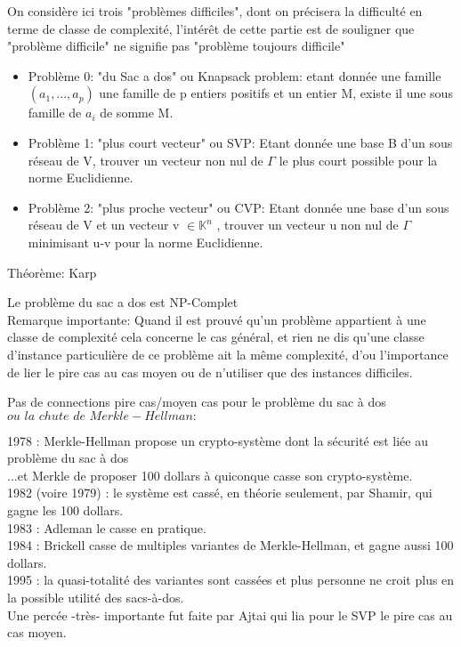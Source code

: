 On considère ici trois "problèmes difficiles", dont on précisera la difficulté en terme de classe de complexité, l'intérêt de cette partie est de souligner que "problème difficile" ne signifie pas "problème toujours difficile"
\begin{itemize}
	\item[] Problème 0: "du Sac a dos" ou Knapsack problem:
	 etant donnée une famille $(a_1, ..., a_p)$ une famille de p entiers positifs et un entier M, 
	 existe il une sous famille de $a_i$ de somme M.\\
	
	\item[] Problème 1: "plus court vecteur" ou SVP: Etant donnée une base B d'un sous réseau de V, 
	trouver un vecteur non nul de $\Gamma$ le plus court possible pour la norme Euclidienne.\\
	
	\item[] Problème 2: "plus proche vecteur" ou CVP: Etant donnée une base d'un sous réseau de V et un 
	vecteur  v $\in \mathbb{K}^{n}$ , trouver un vecteur u non nul de $\Gamma$ minimisant u-v pour la norme Euclidienne.\\
\end{itemize}

Théorème: Karp


Le problème du sac a dos est NP-Complet\\


Remarque importante: Quand il est prouvé qu'un problème appartient à une classe de complexité cela concerne le cas général, et rien ne dis qu'une classe d'instance particulière de ce problème ait la même complexité, d'ou l'importance de lier le pire cas au cas moyen ou de n'utiliser que des instances difficiles.
\begin{center}
	Pas de connections pire cas/moyen cas pour le problème du sac à dos\\ 
	$\mathit{ou \,\, la  \,\, chute  \,\, de  \,\, Merkle-Hellman :}$\\
\end{center}
1978 : Merkle-Hellman propose un crypto-système dont la sécurité est liée au problème du sac à dos\\ 
...et Merkle de proposer 100 dollars à quiconque casse son crypto-système.\\
1982 (voire 1979) : le système est cassé, en théorie seulement, par Shamir, qui gagne les 100 dollars.\\
1983 : Adleman le casse en pratique.\\
1984 : Brickell casse de multiples variantes de Merkle-Hellman, et gagne aussi 100 dollars.\\
1995 : la quasi-totalité des variantes sont cassées et plus personne ne croit plus en la possible utilité des sacs-à-dos.\\
Une percée -très- importante fut faite par Ajtai qui lia pour le SVP le pire cas au cas moyen.\\

